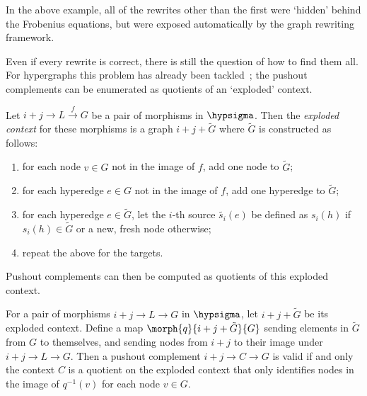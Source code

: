 In the above example, all of the rewrites other than the first were `hidden'
behind the Frobenius equations, but were exposed automatically by the graph
rewriting framework.

Even if every rewrite is correct, there is still the question of how to find
them all.
For hypergraphs this problem has already been
tackled~\cite{heumuller2011construction}; the pushout complements can be
enumerated as quotients of an `exploded' context.

\begin{definition}
    Let \(i+j \to L \xrightarrow{f} G\) be a pair of morphisms in
    \(\hypsigma\).
    Then the \emph{exploded context} for these morphisms is a graph
    \(i + j + \tilde{G}\) where \(\tilde{G}\) is constructed as follows:
    \begin{enumerate}
        \item for each node \(v \in G\) not in the image of \(f\), add one
              node to \(\tilde{G}\);
        \item for each hyperedge \(e \in G\) not in the image of \(f\), add one
              hyperedge to \(\tilde{G}\);
        \item for each hyperedge \(e \in \tilde{G}\), let the \(i\)-th source
              \(\tilde{s_i}(e)\) be defined as \(s_i(h)\) if
              \(s_i(h) \in \tilde{G}\) or a new, fresh node otherwise;
        \item repeat the above for the targets.
    \end{enumerate}
\end{definition}

Pushout complements can then be computed as quotients of this exploded
context.

\begin{proposition}
    For a pair of morphisms \(i+j \to L \to G\) in \(\hypsigma\), let
    \(i + j + \tilde{G}\) be its exploded context.
    Define a map \(\morph{q}{i + j + \tilde{G}}{G}\) sending elements in
    \(\tilde{G}\) from \(G\) to themselves, and sending nodes from
    \(i + j\) to their image under \(i + j \to L \to G\).
    Then a pushout complement \(i + j \to C \to G\) is valid if and only the
    context \(C\) is a quotient on the exploded context that only identifies
    nodes in the image of \(q^{-1}(v)\) for each node \(v \in G\).
\end{proposition}

